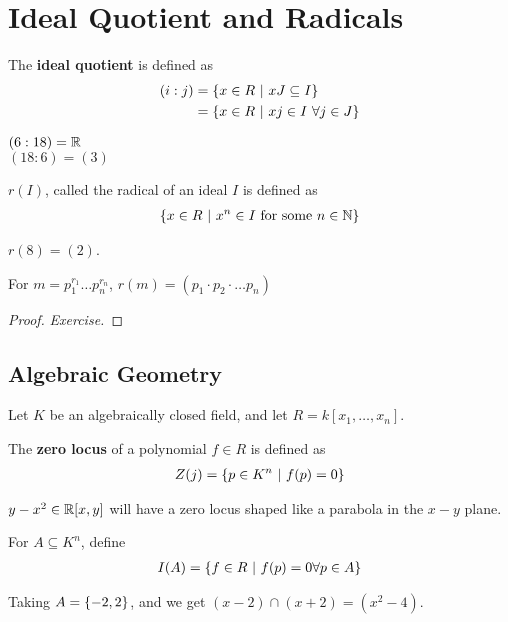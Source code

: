 \documentclass[12pt, twosided]{article}
\begin{document}
\section{Ideal Quotient and Radicals}

\begin{df}
  The \textbf{ideal quotient} is defined as
  \begin{align*}
    (i:j) &= \left\{ x \in R \ \middle\vert\  xJ \subseteq I \right\} \\
          &= \left\{ x \in R \ \middle\vert\  xj \in I\ \forall j \in J \right\}
  \end{align*}
\end{df}
\begin{exa}
  \((6:18) = \mathbb{R}\)\\
  \((18:6) = (3)\)
\end{exa}
\begin{df}
  \(r(I)\), called the radical of an ideal \(I\) is defined as
  \begin{align*}
    \left\{ x \in R \ \middle\vert\  x^n \in I \text{ for some } n \in \mathbb{N} \right\}
  \end{align*}
\end{df}

\begin{exa}
  \(r(8) = (2)\).
\end{exa}

\begin{prop}\label{Prob2.3}
  For \(m = p_1^{r_1}\ldots p_n^{r_n}\), \(r(m) = (p_1 \cdot p_2 \cdot \ldots p_n)\)
\end{prop}
\begin{proof}
  {\color{red} \textit{Exercise.}}
\end{proof}
\subsection{Algebraic Geometry}

Let \(K\) be an algebraically closed field, and let \(R = k[x_1, \ldots, x_n]\).

\begin{df}
  The \textbf{zero locus} of a polynomial \(f \in R\) is defined as
  \begin{align*}
    Z(j) = \left\{ p \in K^n \ \middle\vert\  f(p) = 0 \right\}
  \end{align*}
\end{df}

\begin{exa}
  \(y - x^2 \in \mathbb{R}[x, y]\) will have a zero locus shaped like a parabola in the \(x-y\) plane.
\end{exa}
  \begin{df}
    For \(A \subseteq K^n\), define
    \begin{align*}
      I(A) = \left\{ f \in R \ \middle\vert\  f(p) = 0 \forall p \in A \right\}
    \end{align*}
  \end{df}
  \begin{exa}
    Taking \(A = \left\{ -2, 2 \right\}\), and we get \((x-2) \cap (x + 2) = (x^2 - 4)\).
  \end{exa}
\end{document}
